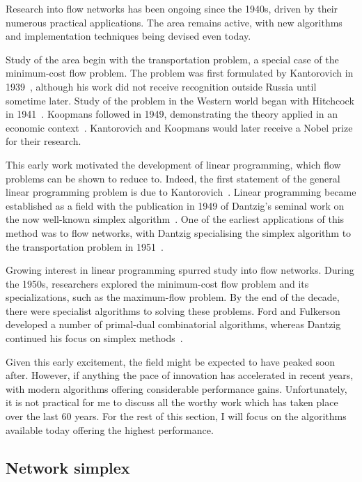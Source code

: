 Research into flow networks has been ongoing since the 1940s, driven by their numerous practical applications. The area remains active, with new algorithms and implementation techniques being devised even today.

Study of the area begin with the transportation problem, a special case of the minimum-cost flow problem. The problem was first formulated by Kantorovich in 1939~\cite{Kantorovich:1960}, although his work did not receive recognition outside Russia until sometime later. Study of the problem in the Western world began with Hitchcock in 1941~\cite{Hitchcock:1941}. Koopmans followed in 1949, demonstrating the theory applied in an economic context~\cite{Koopmans:1949}. Kantorovich and Koopmans would later receive a Nobel prize for their research\footnotemark.

This early work motivated the development of linear programming, which flow problems can be shown to reduce to. Indeed, the first statement of the general linear programming problem is due to Kantorovich~\cite{Kantorovich:1960}. Linear programming became established  as a field with the publication in 1949 of Dantzig's seminal work on the now well-known simplex algorithm~\cite{Dantzig:1949}. One of the earliest applications of this method was to flow networks, with Dantzig specialising the simplex algorithm to the transportation problem in 1951~\cite{Dantzig:1951}.

Growing interest in linear programming spurred study into flow networks. During the 1950s, researchers explored the minimum-cost flow problem and its specializations, such as the maximum-flow problem. By the end of the decade, there were specialist algorithms to solving these problems. Ford and Fulkerson developed a number of primal-dual combinatorial algorithms, whereas Dantzig continued his focus on simplex methods~\cite{FordFulkerson:1962,Dantzig:1962}.

Given this early excitement, the field might be expected to have peaked soon after. However, if anything the pace of innovation has accelerated in recent years, with modern algorithms offering considerable performance gains. Unfortunately, it is not practical for me to discuss all the worthy work which has taken place over the last 60 years. For the rest of this section, I will focus on the algorithms available today offering the highest performance.

\subsection{Network simplex}

